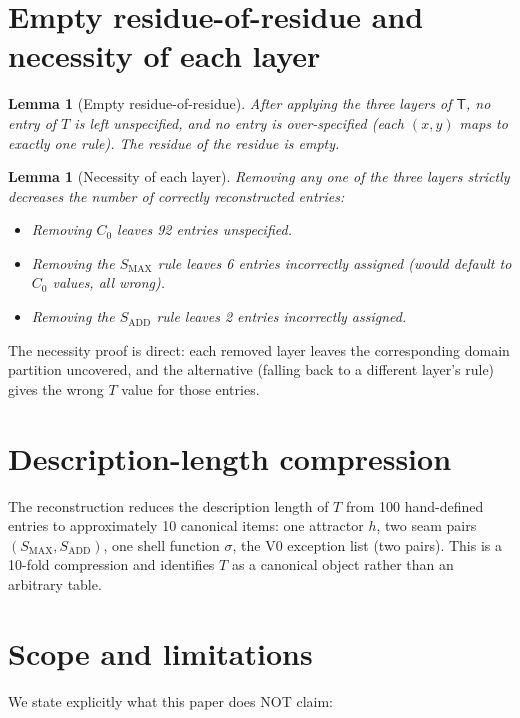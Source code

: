 \documentclass[11pt,reqno]{amsart}
\theoremstyle{plain}
\newtheorem{lemma}[theorem]{Lemma}
\theoremstyle{definition}
\begin{document}
\section{Empty residue-of-residue and necessity of each layer}

\begin{lemma}[Empty residue-of-residue]
After applying the three layers of $\mathsf{T}$, no entry of $T$
is left unspecified, and no entry is over-specified (each $(x, y)$
maps to exactly one rule). The residue of the residue is empty.
\end{lemma}

\begin{lemma}[Necessity of each layer]
Removing any one of the three layers strictly decreases the number
of correctly reconstructed entries:
\begin{itemize}
\item Removing $C_0$ leaves 92 entries unspecified.
\item Removing the $S_{\mathrm{MAX}}$ rule leaves 6 entries
incorrectly assigned (would default to $C_0$ values, all wrong).
\item Removing the $S_{\mathrm{ADD}}$ rule leaves 2 entries
incorrectly assigned.
\end{itemize}
\end{lemma}

The necessity proof is direct: each removed layer leaves the
corresponding domain partition uncovered, and the alternative
(falling back to a different layer's rule) gives the wrong $T$
value for those entries.

\section{Description-length compression}

The reconstruction reduces the description length of $T$ from 100
hand-defined entries to approximately 10 canonical items: one
attractor $h$, two seam pairs $(S_{\mathrm{MAX}}, S_{\mathrm{ADD}})$,
one shell function $\sigma$, the V0 exception list (two pairs).
This is a 10-fold compression and identifies $T$ as a canonical
object rather than an arbitrary table.

\section{Scope and limitations}

We state explicitly what this paper does NOT claim:
\end{document}
